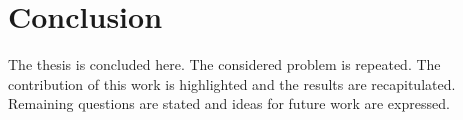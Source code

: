 \chapter{Conclusion}

The thesis is concluded here. The considered problem is repeated. The
contribution of this work is highlighted and the results are recapitulated.
Remaining questions are stated and ideas for future work are expressed. 
